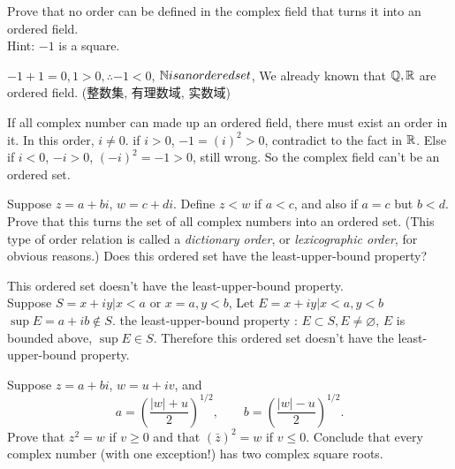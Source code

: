 \begin{myExercise}
    \label{ex:1.8}
    Prove that no order can be defined in the complex field that turns it into an ordered field. \\
    Hint: $-1$ is a square.
\end{myExercise}


\mySolve
$-1+1=0, 1>0, \therefore -1<0$, ${\protect\mathbb N} is an ordered set$, We already known that ${\protect\mathbb Q}, {\protect\mathbb R}$ are ordered field. (整数集, 有理数域, 实数域)

If all complex number can made up an ordered field, there must exist an order in it. In this order, $i \neq 0$. if $i > 0$, $-1 = (i)^2 > 0$, contradict to the fact in ${\protect\mathbb R}$. Else if $i < 0$, $-i > 0$, $(-i)^2 = -1 > 0$, still wrong. So the complex field can't be an ordered set.


\begin{myExercise}
    \label{ex:1.9}
    Suppose $z=a+ bi$, $w=c+di$. Define $z<w$ if $a<c$, and also if $a=c$ but
    $b < d$. Prove that this turns the set of all complex numbers into an ordered set.
    (This type of order relation is called a \emph{dictionary order}, or \emph{lexicographic order}, for
    obvious reasons.) Does this ordered set have the least-upper-bound property?
\end{myExercise}

\mySolve

This ordered set doesn't have the least-upper-bound property.\\
Suppose $S = {x+iy| x<a \text{ or } x=a, y<b}$,
Let $E = {x+iy|x<a,y<b}$ $\sup E = a+ib \not\in S$.
the least-upper-bound property : $E \subset S, E \neq \varnothing$, $E$ is bounded above, $\sup E \in S$.
Therefore this ordered set doesn't have the least-upper-bound property.

\begin{myExercise}    
    \label{ex:1.10}
    Suppose $z = a + bi$, $w =u + iv$, and
    \begin{equation*}
        a = \left(\frac{|w|+u}{2}\right)^{1/2},\qquad
        b = \left(\frac{|w|-u}{2}\right)^{1/2}.
    \end{equation*}
    Prove that $z^2 = w$ if $v \geq 0$ and that $(\bar{z})^2 = w$ if $v \leq 0$. Conclude that every complex
    number (with one exception!) has two complex square roots.
\end{myExercise}

